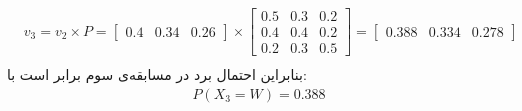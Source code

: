 \begin{ابجد}
\begin{align*}
     & v_3 = v_2 \times P = \begin{bmatrix}0.4 & 0.34 & 0.26\end{bmatrix} \times \begin{bmatrix} 0.5 & 0.3 & 0.2 \\ 0.4 & 0.4 & 0.2 \\ 0.2 & 0.3 & 0.5 \end{bmatrix} = \begin{bmatrix}0.388 & 0.334 & 0.278\end{bmatrix} \\
\end{align*}
بنابراین احتمال برد در مسابقه‌ی سوم برابر است با:
\begin{align*}
    P(X_3 = W) = 0.388
\end{align*}


\end{ابجد}